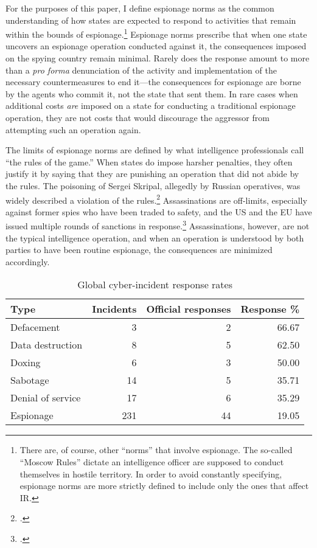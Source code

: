 \documentclass[12pt]{extarticle}
\begin{document}
For the purposes of this paper, I define espionage norms as the common understanding of how states are expected to respond to activities that remain within the bounds of espionage.\footnote{There are, of course, other \enquote{norms} that involve espionage. The so-called \enquote{Moscow Rules} dictate an intelligence officer are supposed to conduct themselves in hostile territory. In order to avoid constantly specifying, espionage norms are more strictly defined to include only the ones that affect IR.} Espionage norms prescribe that when one state uncovers an espionage operation conducted against it, the consequences imposed on the spying country remain minimal. Rarely does the response amount to more than a \emph{pro forma} denunciation of the activity and implementation of the necessary countermeasures to end it---the consequences for espionage are borne by the agents who commit it, not the state that sent them. In rare cases when additional costs \emph{are} imposed on a state for conducting a traditional espionage operation, they are not costs that would discourage the aggressor from attempting such an operation again.

The limits of espionage norms are defined by what intelligence professionals call \enquote{the rules of the game.} When states do impose harsher penalties, they often justify it by saying that they are punishing an operation that did not abide by the rules. The poisoning of Sergei Skripal, allegedly by Russian operatives, was widely described a violation of the rules.\footcite{masters_has_2018} Assassinations are off-limits, especially against former spies who have been traded to safety, and the US and the EU have issued multiple rounds of sanctions in response.\footcite{reuters_e.u._2019} Assassinations, however, are not the typical intelligence operation, and when an operation is understood by both parties to have been routine espionage, the consequences are minimized accordingly.

\begin{table}[ht]
\centering
\begin{tabular}{lrrr}
  \hline
Type & Incidents & Official responses & Response \% \\
  \hline
Defacement &   3 &   2 & 66.67 \\
  Data destruction &   8 &   5 & 62.50 \\
  Doxing &   6 &   3 & 50.00 \\
  Sabotage &  14 &   5 & 35.71 \\
  Denial of service &  17 &   6 & 35.29 \\
  Espionage & 231 &  44 & 19.05 \\
   \hline
\end{tabular}
\caption{Global cyber-incident response rates}
\label{response-pct}
\end{table}
\end{document}
